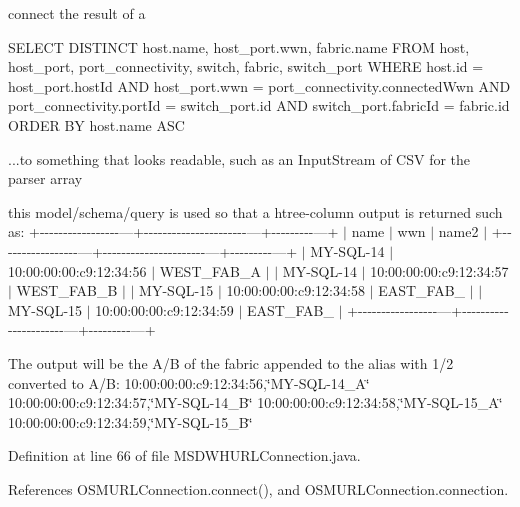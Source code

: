 connect the result of a 

S\+E\+L\+E\+C\+T D\+I\+S\+T\+I\+N\+C\+T host.\+name, host\+\_\+port.\+wwn, fabric.\+name F\+R\+O\+M host, host\+\_\+port, port\+\_\+connectivity, switch, fabric, switch\+\_\+port W\+H\+E\+R\+E host.\+id = host\+\_\+port.\+host\+Id A\+N\+D host\+\_\+port.\+wwn = port\+\_\+connectivity.\+connected\+Wwn A\+N\+D port\+\_\+connectivity.\+port\+Id = switch\+\_\+port.\+id A\+N\+D switch\+\_\+port.\+fabric\+Id = fabric.\+id O\+R\+D\+E\+R B\+Y host.\+name A\+S\+C

...to something that looks readable, such as an Input\+Stream of C\+S\+V for the parser array

this model/schema/query is used so that a htree-\/column output is returned such as\+: +-\/-\/-\/-\/-\/-\/-\/-\/-\/-\/-\/-\/-\/-\/-\/-\/-\/---+-\/-\/-\/-\/-\/-\/-\/-\/-\/-\/-\/-\/-\/-\/-\/-\/-\/-\/-\/-\/-\/-\/---+-\/-\/-\/-\/-\/-\/-\/-\/-\/---+ $\vert$ name $\vert$ wwn $\vert$ name2 $\vert$ +-\/-\/-\/-\/-\/-\/-\/-\/-\/-\/-\/-\/-\/-\/-\/-\/-\/---+-\/-\/-\/-\/-\/-\/-\/-\/-\/-\/-\/-\/-\/-\/-\/-\/-\/-\/-\/-\/-\/-\/---+-\/-\/-\/-\/-\/-\/-\/-\/-\/---+ $\vert$ M\+Y-\/\+S\+Q\+L-\/14 $\vert$ 10\+:00\+:00\+:00\+:c9\+:12\+:34\+:56 $\vert$ W\+E\+S\+T\+\_\+\+F\+A\+B\+\_\+\+A $\vert$ $\vert$ M\+Y-\/\+S\+Q\+L-\/14 $\vert$ 10\+:00\+:00\+:00\+:c9\+:12\+:34\+:57 $\vert$ W\+E\+S\+T\+\_\+\+F\+A\+B\+\_\+\+B $\vert$ $\vert$ M\+Y-\/\+S\+Q\+L-\/15 $\vert$ 10\+:00\+:00\+:00\+:c9\+:12\+:34\+:58 $\vert$ E\+A\+S\+T\+\_\+\+F\+A\+B\+\_ $\vert$ $\vert$ M\+Y-\/\+S\+Q\+L-\/15 $\vert$ 10\+:00\+:00\+:00\+:c9\+:12\+:34\+:59 $\vert$ E\+A\+S\+T\+\_\+\+F\+A\+B\+\_ $\vert$ +-\/-\/-\/-\/-\/-\/-\/-\/-\/-\/-\/-\/-\/-\/-\/-\/-\/---+-\/-\/-\/-\/-\/-\/-\/-\/-\/-\/-\/-\/-\/-\/-\/-\/-\/-\/-\/-\/-\/-\/---+-\/-\/-\/-\/-\/-\/-\/-\/-\/---+

The output will be the A/\+B of the fabric appended to the alias with 1/2 converted to A/\+B\+: 10\+:00\+:00\+:00\+:c9\+:12\+:34\+:56,\char`\"{}\+M\+Y-\/\+S\+Q\+L-\/14\+\_\+\+A\char`\"{} 10\+:00\+:00\+:00\+:c9\+:12\+:34\+:57,\char`\"{}\+M\+Y-\/\+S\+Q\+L-\/14\+\_\+\+B\char`\"{} 10\+:00\+:00\+:00\+:c9\+:12\+:34\+:58,\char`\"{}\+M\+Y-\/\+S\+Q\+L-\/15\+\_\+\+A\char`\"{} 10\+:00\+:00\+:00\+:c9\+:12\+:34\+:59,\char`\"{}\+M\+Y-\/\+S\+Q\+L-\/15\+\_\+\+B\char`\"{} 

Definition at line 66 of file M\+S\+D\+W\+H\+U\+R\+L\+Connection.\+java.



References O\+S\+M\+U\+R\+L\+Connection.\+connect(), and O\+S\+M\+U\+R\+L\+Connection.\+connection.



